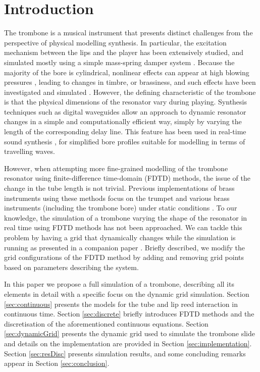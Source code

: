 \section{Introduction}\label{sec:introduction}

The trombone is a musical instrument that presents distinct challenges from the perspective of physical modelling synthesis.
In particular, the excitation mechanism between the lips and the player has been extensively studied, and simulated mostly using a simple mass-spring damper system \cite{campbell2004brass}.
Because the majority of the bore is cylindrical, nonlinear effects can appear at high blowing pressures \cite{Hirschberg96}, leading to changes in timbre, or brassiness, and such effects have been investigated and simulated
\cite{campbell2004brass, msallam1997physical,msallam2000physical}.
However, the defining characteristic of the trombone is that the physical dimensions of the resonator vary during playing.
Synthesis techniques such as digital waveguides allow an approach to dynamic resonator changes in a simple and computationally efficient way, simply by varying the length of the corresponding delay line. This feature has been used in real-time sound synthesis \cite{cook2002real}, for simplified bore profiles suitable for modelling in terms of travelling waves.

However, when attempting more fine-grained modelling of the trombone resonator using finite-difference time-domain (FDTD) methods, the issue of the change in the tube length is not trivial. Previous implementations of brass instruments using these methods focus on the trumpet \cite{harrison2015environment} and various brass instruments (including the trombone bore) under static conditions \cite{Bilbao2013}. To our knowledge, the simulation of a trombone varying the shape of the resonator in real time using FDTD methods has not been approached.
We can tackle this problem by having a grid that dynamically changes while the simulation is running as presented in a companion paper \cite{Willemsen2021}. Briefly described, we modify the grid configurations of the FDTD method by adding and removing grid points based on parameters describing the system. 

In this paper we propose a full simulation of a trombone, describing all its elements in detail with a specific focus on the dynamic grid simulation. Section \ref{sec:continuous} presents the models for the tube and lip reed interaction in continuous time. Section \ref{sec:discrete} briefly introduces FDTD methods and the discretisation of the aforementioned continuous equations. Section \ref{sec:dynamicGrid} presents the dynamic grid used to simulate the trombone slide and details on the implementation are provided in Section \ref{sec:implementation}. Section \ref{sec:resDisc} presents simulation results, and some concluding remarks appear in Section \ref{sec:conclusion}.